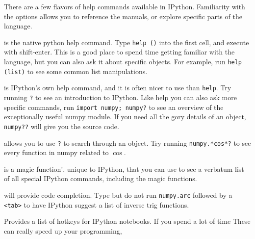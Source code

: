 \documentclass[justified]{tufte-handout}
\begin{document}
\smallskip
\noindent
There are a few flavors of help commands available in IPython. Familiarity with
the options allows you to reference the manuals, or explore specific parts of
the language.  
\\
\begin{description}[font=\tt, leftmargin=0cm]
\item[help ()] is the native python help command. Type \texttt{help ()} into the
  first cell, and execute with shift-enter. This is a good place to spend time
  getting familiar with the language, but you can also ask it about specific
  objects. For example, run \texttt{help (list)} to see some common list
  manipulations.
\item[?] is IPython's own help command, and it is often nicer to use than
  \texttt{help}. Try running \texttt{?} to see an introduction to IPython. Like
  help you can also ask more specific commands, run \texttt{import numpy;
    numpy?} to see an overview of the exceptionally useful numpy module. If you
  need all the gory details of an object, \texttt{numpy??} will give you the
  source code.
\item[<regex>?] allows you to use \texttt{?} to search through an object. Try
  running \texttt{numpy.*cos*?} to see every function in numpy related to
  $\cos$.
\item[\%quickref] is a magic function', unique to IPython, that you can use to
  see a verbatum list of all special IPython commands, including the magic
  functions.
\item[<tab>] will provide code completion. Type but do not run
  \texttt{numpy.arc} followed by a \texttt{<tab>} to have IPython suggest a list
  of inverse trig functions.
\item[Control-m h] Provides a list of hotkeys for IPython notebooks. If you
  spend a lot of time These can
  really speed up your programming,
\end{description}

\pagebreak
\end{document}
